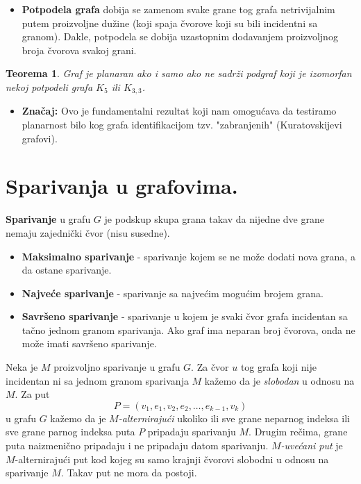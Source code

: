 \documentclass[a4paper,12pt]{article}
\numberwithin{algorithm}{section}
\theoremstyle{plain}
\newtheorem{theorem}{Teorema}[section]
\theoremstyle{definition}
\theoremstyle{remark}
\begin{document}
\begin{itemize}
    \item \textbf{Potpodela grafa} dobija se zamenom svake grane tog grafa netrivijalnim putem proizvoljne dužine (koji spaja čvorove koji su bili incidentni sa granom). Dakle, potpodela se dobija uzastopnim dodavanjem proizvoljnog broja čvorova svakoj grani.
\end{itemize}
\begin{theorem}
    Graf je planaran ako i samo ako ne sadrži podgraf koji je izomorfan nekoj potpodeli grafa $K_5$ ili $K_{3,3}$.
\end{theorem}

\begin{itemize}
    \item \textbf{Značaj:} Ovo je fundamentalni rezultat koji nam omogućava da testiramo planarnost bilo kog grafa identifikacijom tzv. "{zabranjenih}"  (Kuratovskijevi grafovi).
\end{itemize}
\newpage
\section{Sparivanja u grafovima.}
\textbf{Sparivanje} u grafu $G$ je podskup skupa grana takav da nijedne dve grane nemaju zajednički čvor (nisu susedne).

\begin{itemize}
    \item \textbf{Maksimalno sparivanje} - sparivanje kojem se ne može dodati nova grana, a da ostane sparivanje.
    \item \textbf{Najveće sparivanje} - sparivanje sa najvećim mogućim brojem grana.
    \item \textbf{Savršeno sparivanje} - sparivanje u kojem je svaki čvor grafa incidentan sa tačno jednom granom sparivanja. Ako graf ima neparan broj čvorova, onda ne može imati savršeno sparivanje.
\end{itemize}

Neka je $M$ proizvoljno sparivanje u grafu $G$. Za čvor $u$ tog grafa koji nije incidentan ni sa jednom granom sparivanja $M$ kažemo da je \emph{slobodan} u odnosu na $M$. Za put
\[ P = (v_1, e_1, v_2, e_2, \dots, e_{k-1}, v_k) \]
u grafu $G$ kažemo da je \emph{$M$-alternirajući} ukoliko ili sve grane neparnog indeksa ili sve grane parnog indeksa puta $P$ pripadaju sparivanju $M$. Drugim rečima, grane puta naizmenično pripadaju i ne pripadaju datom sparivanju. \emph{$M$-uvećani put} je $M$-alternirajući put kod kojeg su samo krajnji čvorovi slobodni u odnosu na sparivanje $M$. Takav put ne mora da postoji.
\end{document}
